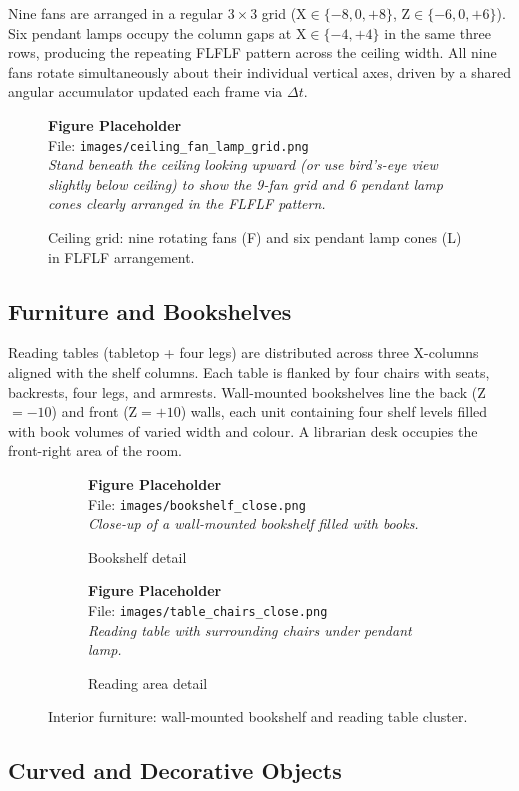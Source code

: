 \documentclass[12pt, a4paper]{article}
\newcommand{\imgph}[2]{%
    \begin{mdframed}[backgroundcolor=lightblue!60, linecolor=sectionblue,
                     linewidth=1pt, roundcorner=4pt, innertopmargin=8pt,
                     innerbottommargin=8pt]
        \centering
        {\bfseries\color{sectionblue} Figure Placeholder}\\[4pt]
        File: \texttt{#1}\\[3pt]
        {\small\itshape #2}
    \end{mdframed}%
}
\begin{document}
Nine fans are arranged in a regular $3{\times}3$ grid (X$\in\{-8,0,+8\}$, Z$\in\{-6,0,+6\}$). Six pendant lamps occupy the column gaps at X$\in\{-4,+4\}$ in the same three rows, producing the repeating FLFLF pattern across the ceiling width. All nine fans rotate simultaneously about their individual vertical axes, driven by a shared angular accumulator updated each frame via $\Delta t$.

\begin{figure}[H]
    \centering
    \imgph{images/ceiling_fan_lamp_grid.png}{%
        Stand beneath the ceiling looking upward (or use bird's-eye view slightly below ceiling)
        to show the 9-fan grid and 6 pendant lamp cones clearly arranged in the FLFLF pattern.}
    \caption{Ceiling grid: nine rotating fans (F) and six pendant lamp cones (L) in FLFLF arrangement.}
    \label{fig:ceilinggrid}
\end{figure}

\subsection{Furniture and Bookshelves}

Reading tables (tabletop + four legs) are distributed across three X-columns aligned with the shelf columns. Each table is flanked by four chairs with seats, backrests, four legs, and armrests. Wall-mounted bookshelves line the back (Z$=-10$) and front (Z$=+10$) walls, each unit containing four shelf levels filled with book volumes of varied width and colour. A librarian desk occupies the front-right area of the room.

\begin{figure}[H]
    \centering
    \begin{subfigure}{0.47\textwidth}
        \imgph{images/bookshelf_close.png}{Close-up of a wall-mounted bookshelf filled with books.}
        \caption{Bookshelf detail}
    \end{subfigure}\hfill
    \begin{subfigure}{0.47\textwidth}
        \imgph{images/table_chairs_close.png}{Reading table with surrounding chairs under pendant lamp.}
        \caption{Reading area detail}
    \end{subfigure}
    \caption{Interior furniture: wall-mounted bookshelf and reading table cluster.}
    \label{fig:furniture}
\end{figure}

\subsection{Curved and Decorative Objects}
\end{document}
